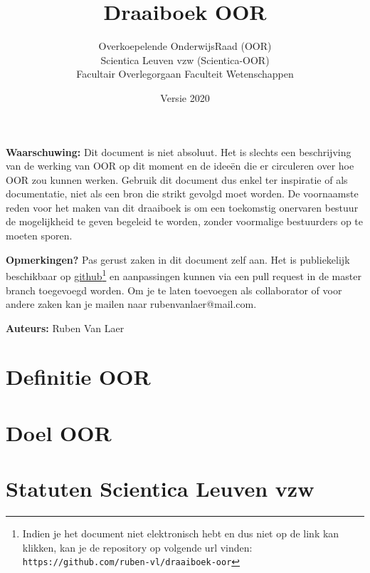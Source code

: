 \documentclass[a4paper,11pt]{article}
\title{Draaiboek OOR}
\author{Overkoepelende OnderwijsRaad (OOR) \\ Scientica Leuven vzw (Scientica-OOR) \\ Facultair Overlegorgaan Faculteit Wetenschappen}
\date{Versie 2020}
\begin{document}
	\maketitle
	
	\vspace*{\fill}
	
	\textbf{Waarschuwing:} Dit document is niet absoluut. Het is slechts een beschrijving van de werking van OOR op dit moment en de ideeën die er circuleren over hoe OOR zou kunnen werken. Gebruik dit document dus enkel ter inspiratie of als documentatie, niet als een bron die strikt gevolgd moet worden. De voornaamste reden voor het maken van dit draaiboek is om een toekomstig onervaren bestuur de mogelijkheid te geven begeleid te worden, zonder voormalige bestuurders op te moeten sporen.\newline
	
	\textbf{Opmerkingen?} Pas gerust zaken in dit document zelf aan. Het is publiekelijk beschikbaar op \hyperlink{https://github.com/ruben-vl/draaiboek-oor}{github}\footnote{Indien je het document niet elektronisch hebt en dus niet op de link kan klikken, kan je de repository op volgende url vinden: \texttt{https://github.com/ruben-vl/draaiboek-oor}} en aanpassingen kunnen via een pull request in de master branch toegevoegd worden. Om je te laten toevoegen als collaborator of voor andere zaken kan je mailen naar rubenvanlaer@mail.com.\newline

	\textbf{Auteurs:} Ruben Van Laer
	
	\newpage
	
	\tableofcontents
	
	\newpage
	
	\section{Definitie OOR}
	
	\section{Doel OOR}
	
	\section{Statuten Scientica Leuven vzw}
	
	
	
\end{document}
